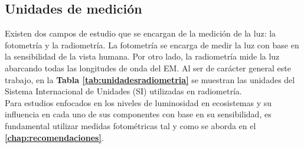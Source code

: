 \newpage

\subsection{Unidades de medición}

Existen dos campos de estudio que se encargan de la medición de la luz: la fotometría y la radiometría. La fotometría se encarga de medir la luz con base en la sensibilidad de la vista humana. Por otro lado, la radiometría mide la luz abarcando todas las longitudes de onda del EM. Al ser de carácter general este trabajo, en la \textbf{Tabla \ref{tab:unidadesradiometria}} se muestran las unidades del Sistema Internacional de Unidades (SI) utilizadas en radiometría.\\

Para estudios enfocados en los niveles de luminosidad en ecosistemas y su influencia en cada uno de sus componentes con base en su sensibilidad, es fundamental utilizar medidas fotométricas tal y como se aborda en el \textbf{\autoref{chap:recomendaciones}}.


